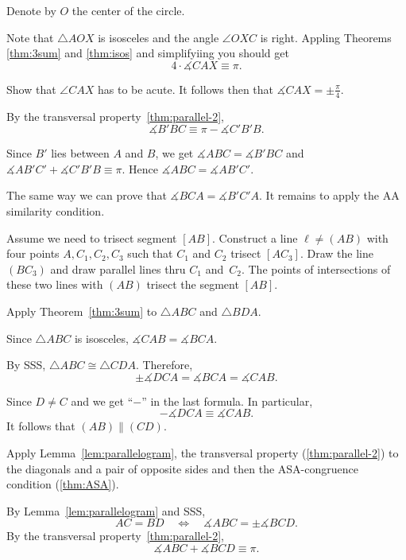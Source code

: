Denote by $O$ the center of the circle.

Note that $\triangle AOX$ is isosceles
and the angle $\angle OXC$ is right.
Appling Theorems \ref{thm:3sum} and \ref{thm:isos} and simplifyiing you should get
\[
4\cdot \measuredangle CAX
\equiv
\pi.
\]

Show that $\angle CAX$ has to be acute.
It follows then that 
$\measuredangle CAX=\pm\tfrac\pi4$.


By the transversal property~\ref{thm:parallel-2},
\[\measuredangle B'BC \equiv \pi -\measuredangle C'B'B.\]

Since $B'$ lies between $A$ and $B$, we get 
$\measuredangle ABC=\measuredangle B'BC$ and $\measuredangle AB'C'+\measuredangle C'B'B\equiv \pi$.
Hence $\measuredangle ABC= \measuredangle AB'C'$.

The same way we can prove that 
$\measuredangle BCA= \measuredangle B'C'A$.
It remains to apply the AA similarity condition.

Assume we need to trisect segment $[AB]$.
Construct a line $\ell\ne (AB)$ with four points $A,C_1,C_2, C_3$
such that $C_1$ and $C_2$ trisect $[AC_3]$.
Draw the line $(BC_3)$
and draw parallel lines thru $C_1$ and~$C_2$.
The points of intersections of these two lines with $(AB)$ trisect the segment $[AB]$.

Apply Theorem~\ref{thm:3sum} to $\triangle ABC$ and $\triangle BDA$.

Since $\triangle ABC$ is isosceles, $\measuredangle CAB=\measuredangle BCA$.
 
By SSS, $\triangle ABC\cong \triangle CDA$.
Therefore, 
$$\pm\measuredangle DCA= \measuredangle BCA=\measuredangle CAB.$$

Since $D\ne C$ and we get ``$-$'' in the last formula.
In particular,
$$-\measuredangle DCA\equiv \measuredangle CAB.$$
It follows that $(AB)\parallel (CD)$.

Apply Lemma~\ref{lem:parallelogram},
the transversal property (\ref{thm:parallel-2}) to the diagonals and a pair of opposite sides and then the ASA-congruence condition (\ref{thm:ASA}).

By Lemma~\ref{lem:parallelogram} and SSS, 
\[AC=BD
\quad
\iff
\quad
\measuredangle ABC=\pm \measuredangle BCD.\]
By the transversal property~\ref{thm:parallel-2}, 
\[\measuredangle ABC+\measuredangle BCD\equiv \pi.\]

